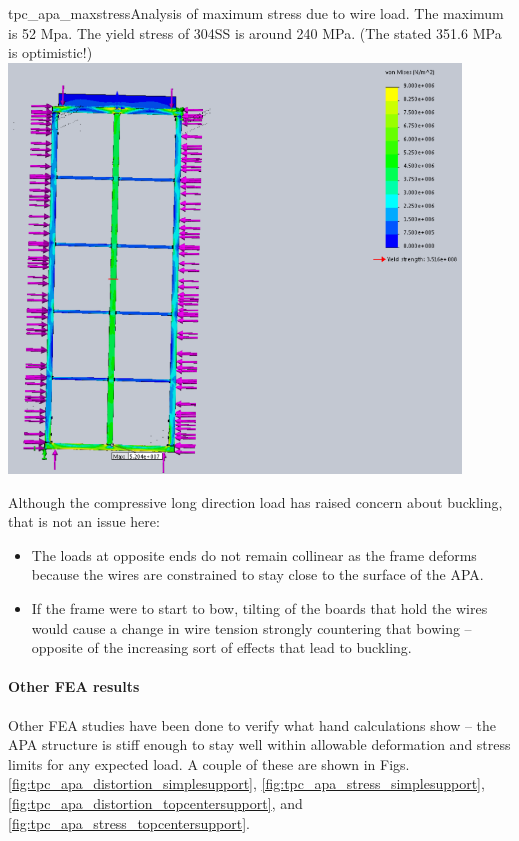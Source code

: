 \begin{cdrfigure}{tpc_apa_maxstress}{Analysis of maximum stress due to wire load.  The maximum is 52 Mpa.  The yield stress of 304SS is around 240 MPa. (The stated 351.6 MPa is optimistic!)}
\includegraphics[width=0.9\textwidth]{figures/tpc_apa_maxstress.png} 
\end{cdrfigure}

Although the compressive long direction load has raised concern about buckling, that is not an issue here:
\begin{itemize}
\item{The loads at opposite ends do not remain collinear as the frame deforms because the wires are constrained to stay close to the surface of the APA.}
\item{If the frame were to start to bow, tilting of the boards that hold the wires would cause a change in wire tension strongly countering that bowing -- opposite of the increasing sort of effects that lead to buckling.}
\end{itemize}

\paragraph{Other FEA results}

Other FEA studies have been done to verify what hand calculations show -- the APA structure is stiff enough to stay well within allowable deformation and stress limits for any expected load.  A couple of these are shown in Figs. \ref{fig:tpc_apa_distortion_simplesupport}, \ref{fig:tpc_apa_stress_simplesupport}, \ref{fig:tpc_apa_distortion_topcentersupport}, and \ref{fig:tpc_apa_stress_topcentersupport}.

